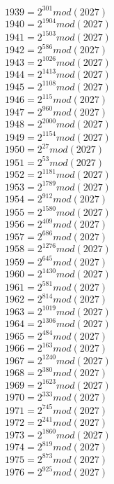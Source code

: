 \documentclass[12pt, letterpaper]{article}
\begin{document}
\begin{itemize}
\begin{multicols}{3}
$1939= 2^{301} mod (2027)$\\
$1940= 2^{1904} mod (2027)$\\
$1941= 2^{1503} mod (2027)$\\
$1942= 2^{586} mod (2027)$\\
$1943= 2^{1026} mod (2027)$\\
$1944= 2^{1413} mod (2027)$\\
$1945= 2^{1108} mod (2027)$\\
$1946= 2^{115} mod (2027)$\\
$1947= 2^{960} mod (2027)$\\
$1948= 2^{2000} mod (2027)$\\
$1949= 2^{1154} mod (2027)$\\
$1950= 2^{27} mod (2027)$\\
$1951= 2^{53} mod (2027)$\\
$1952= 2^{1181} mod (2027)$\\
$1953= 2^{1789} mod (2027)$\\
$1954= 2^{912} mod (2027)$\\
$1955= 2^{1580} mod (2027)$\\
$1956= 2^{409} mod (2027)$\\
$1957= 2^{686} mod (2027)$\\
$1958= 2^{1276} mod (2027)$\\
$1959= 2^{645} mod (2027)$\\
$1960= 2^{1430} mod (2027)$\\
$1961= 2^{581} mod (2027)$\\
$1962= 2^{814} mod (2027)$\\
$1963= 2^{1019} mod (2027)$\\
$1964= 2^{1306} mod (2027)$\\
$1965= 2^{484} mod (2027)$\\
$1966= 2^{163} mod (2027)$\\
$1967= 2^{1240} mod (2027)$\\
$1968= 2^{380} mod (2027)$\\
$1969= 2^{1623} mod (2027)$\\
$1970= 2^{333} mod (2027)$\\
$1971= 2^{745} mod (2027)$\\
$1972= 2^{241} mod (2027)$\\
$1973= 2^{1860} mod (2027)$\\
$1974= 2^{819} mod (2027)$\\
$1975= 2^{873} mod (2027)$\\
$1976= 2^{925} mod (2027)$\\

\end{multicols}
\end{itemize}
\end{document}
